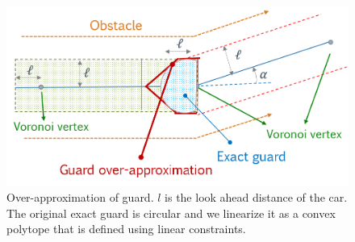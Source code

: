 




\begin{figure}
\centering
\includegraphics[width=0.8\linewidth]{Figures/rss2021-guard-approximate.png}
\caption{Over-approximation of guard.  $l$ is the look ahead distance of the car. The original exact guard is circular and we linearize it as a convex polytope that is defined using linear constraints.}
\label{fig:guard_inv_approx}
\end{figure}


